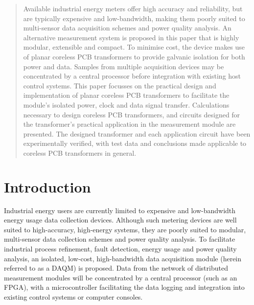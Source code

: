 \documentclass[conference]{IEEEtran}
\begin{document}
\begin{abstract}
Available industrial energy meters offer high accuracy and reliability, but are typically expensive and low-bandwidth, making them poorly suited to multi-sensor data acquisition schemes and power quality analysis.  An alternative measurement system is proposed in this paper that is highly modular, extensible and compact.  To minimise cost, the device makes use of planar coreless PCB transformers to provide galvanic isolation for both power and data. Samples from multiple acquisition devices may be concentrated by a central processor before integration with existing host control systems. This paper focusses on the practical design and implementation of planar coreless PCB transformers to facilitate the module's isolated power, clock and data signal transfer.  Calculations necessary to design coreless PCB transformers, and circuits designed for the transformer's practical application in the measurement module are presented.  The designed transformer and each application circuit have been experimentally verified, with test data and conclusions made applicable to coreless PCB transformers in general.
\end{abstract}


\IEEEpeerreviewmaketitle

\section{Introduction}
Industrial energy users are currently limited to expensive and low-bandwidth energy usage data collection devices. Although such metering devices are well suited to high-accuracy, high-energy systems, they are poorly suited to modular, multi-sensor data collection schemes and power quality analysis.  To facilitate industrial process refinement, fault detection, energy usage and power quality analysis, an isolated, low-cost, high-bandwidth data acquisition module (herein referred to as a DAQM) is proposed.  Data from the network of distributed measurement modules will be concentrated by a central processor (such as an FPGA), with a microcontroller facilitating the data logging and integration into existing control systems or computer consoles.
\end{document}
